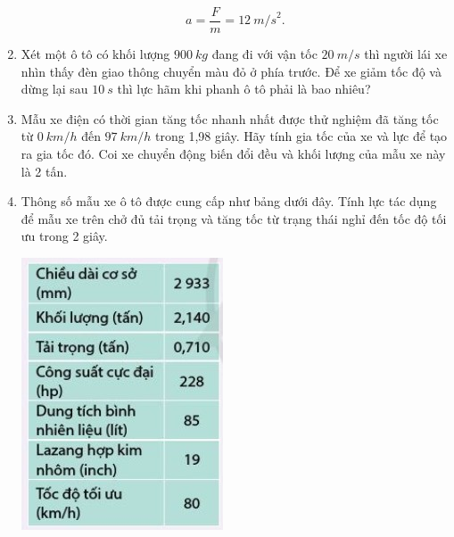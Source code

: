 \begin{enumerate}[label=\bfseries Bài \arabic*:,leftmargin=1.5cm]
{		$$a = \dfrac{F}{m} = \SI{12}{m/s}^2.$$
	}



	\item {}
	
	{
		Xét một ô tô có khối lượng $\SI{900}{kg}$ đang đi với vận tốc $\SI{20}{m/s}$ thì người lái xe nhìn thấy đèn giao thông chuyển màu đỏ ở phía trước. Để xe giảm tốc độ và dừng lại sau $\SI{10}{s}$ thì lực hãm khi phanh ô tô phải là bao nhiêu?
	}
	
	
	\item {}
	
	{
		
		Mẫu xe điện có thời gian tăng tốc nhanh nhất được thử nghiệm đã tăng tốc từ $\SI{0}{km/h}$ đến $\SI{97}{km/h}$ trong 1,98 giây. Hãy tính gia tốc của xe và lực để tạo ra gia tốc đó. Coi xe chuyển động biến đổi đều và khối lượng của mẫu xe này là 2 tấn.
	}
	





	\item {}
	
	{
		
		Thông số mẫu xe ô tô được cung cấp như bảng dưới đây. Tính lực tác dụng để mẫu xe trên chở đủ tải trọng và tăng tốc từ trạng thái nghỉ đến tốc độ tối ưu trong 2 giây.
		
		\begin{center}
			\includegraphics[scale=1]{../figs/VN10-2022-PH-TP016-1.jpg}
		\end{center}
		
}
\end{enumerate}
